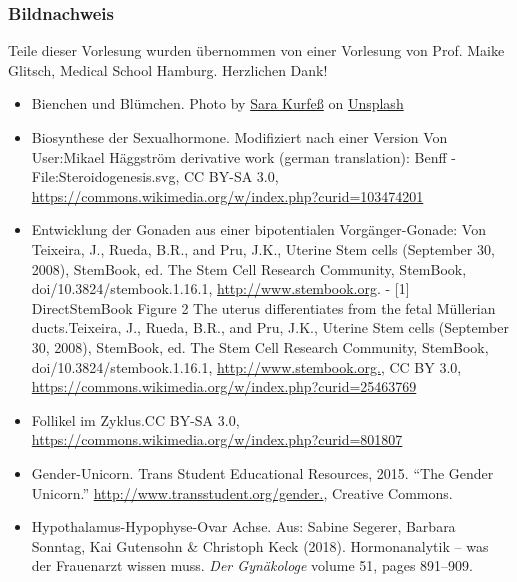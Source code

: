 \documentclass{beamer}
\begin{document}
\begin{frame}
\frametitle{Bildnachweis}

\begin{tiny}

Teile dieser Vorlesung wurden übernommen von einer Vorlesung von Prof. Maike Glitsch, Medical School Hamburg. Herzlichen Dank!


 
\begin{itemize}

   

\item
Bienchen und Blümchen. Photo by \href{https://unsplash.com/@stereophototyp?utm_source=unsplash&utm_medium=referral&utm_content=creditCopyText}{Sara Kurfeß} on \href{https://unsplash.com/s/photos/flowers-and-bees?utm_source=unsplash&utm_medium=referral&utm_content=creditCopyText}{Unsplash}

\item
Biosynthese der Sexualhormone. Modifiziert nach einer Version Von User:Mikael Häggström derivative work (german translation): Benff - File:Steroidogenesis.svg, CC BY-SA 3.0, \url{https://commons.wikimedia.org/w/index.php?curid=103474201}


\item

Entwicklung der Gonaden aus einer bipotentialen Vorgänger-Gonade: Von Teixeira, J., Rueda, B.R., and Pru, J.K., Uterine Stem cells (September 30, 2008), StemBook, ed. The Stem Cell Research Community, StemBook, doi/10.3824/stembook.1.16.1, \url{http://www.stembook.org}. - [1] DirectStemBook Figure 2 The uterus differentiates from the fetal Müllerian ducts.Teixeira, J., Rueda, B.R., and Pru, J.K., Uterine Stem cells (September 30, 2008), StemBook, ed. The Stem Cell Research Community, StemBook, doi/10.3824/stembook.1.16.1, \url{http://www.stembook.org.}, CC BY 3.0, \url{https://commons.wikimedia.org/w/index.php?curid=25463769}

\item
Follikel im Zyklus.CC BY-SA 3.0, \url{https://commons.wikimedia.org/w/index.php?curid=801807}


\item
Gender-Unicorn. Trans Student Educational Resources, 2015. ``The Gender Unicorn.'' \url{http://www.transstudent.org/gender.}, Creative Commons.



\item
Hypothalamus-Hypophyse-Ovar Achse. Aus:    Sabine Segerer, Barbara Sonntag, Kai Gutensohn \& Christoph Keck (2018). Hormonanalytik – was der Frauenarzt wissen muss. \emph{Der Gynäkologe} volume 51, pages 891–909.


\end{itemize}
\end{tiny}
\end{frame}
\end{document}
